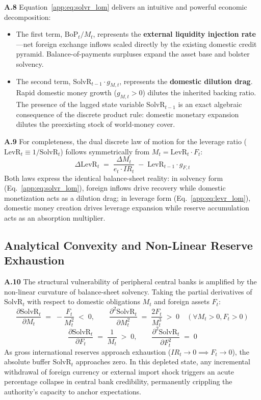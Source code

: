 \textbf{A.8} Equation~\eqref{app:eq:solvr_lom} delivers an intuitive and powerful economic decomposition:
\begin{itemize}[leftmargin=2em]
	\item The first term, $\text{BoP}_t / M_t$, represents the \textbf{external liquidity injection rate}---net foreign exchange inflows scaled directly by the existing domestic credit pyramid. Balance-of-payments surpluses expand the asset base and bolster solvency.
	\item The second term, $\text{SolvR}_{t-1} \cdot g_{M,t}$, represents the \textbf{domestic dilution drag}. Rapid domestic money growth ($g_{M,t} > 0$) dilutes the inherited backing ratio. The presence of the lagged state variable $\text{SolvR}_{t-1}$ is an exact algebraic consequence of the discrete product rule: domestic monetary expansion dilutes the preexisting stock of world-money cover.
\end{itemize}

\textbf{A.9} For completeness, the dual discrete law of motion for the leverage ratio ($\text{LevR}_t \equiv 1/\text{SolvR}_t$) follows symmetrically from $M_t = \text{LevR}_t \cdot F_t$:
\begin{equation}
	\label{app:eq:levr_lom}
	\Delta\text{LevR}_t \;=\; \frac{\Delta M_t}{e_t \cdot IR_t} \;-\; \text{LevR}_{t-1} \cdot g_{F,t}
\end{equation}
Both laws express the identical balance-sheet reality: in solvency form (Eq.~\ref{app:eq:solvr_lom}), foreign inflows drive recovery while domestic monetization acts as a dilution drag; in leverage form (Eq.~\ref{app:eq:levr_lom}), domestic money creation drives leverage expansion while reserve accumulation acts as an absorption multiplier.

\subsection{Analytical Convexity and Non-Linear Reserve Exhaustion}
\label{app:convexity}

\textbf{A.10} The structural vulnerability of peripheral central banks is amplified by the non-linear curvature of balance-sheet solvency. Taking the partial derivatives of $\text{SolvR}_t$ with respect to domestic obligations $M_t$ and foreign assets $F_t$:
\begin{equation}
	\label{app:eq:solvr_derivatives}
	\frac{\partial \text{SolvR}_t}{\partial M_t} \;=\; -\frac{F_t}{M_t^2} \;<\; 0, \qquad \frac{\partial^2 \text{SolvR}_t}{\partial M_t^2} \;=\; \frac{2 F_t}{M_t^3} \;>\; 0 \quad (\forall M_t > 0, F_t > 0)
\end{equation}
\begin{equation}
	\frac{\partial \text{SolvR}_t}{\partial F_t} \;=\; \frac{1}{M_t} \;>\; 0, \qquad \frac{\partial^2 \text{SolvR}_t}{\partial F_t^2} \;=\; 0
\end{equation}
As gross international reserves approach exhaustion ($IR_t \to 0 \implies F_t \to 0$), the absolute buffer $\text{SolvR}_t$ approaches zero. In this depleted state, any incremental withdrawal of foreign currency or external import shock triggers an acute percentage collapse in central bank credibility, permanently crippling the authority's capacity to anchor expectations.

